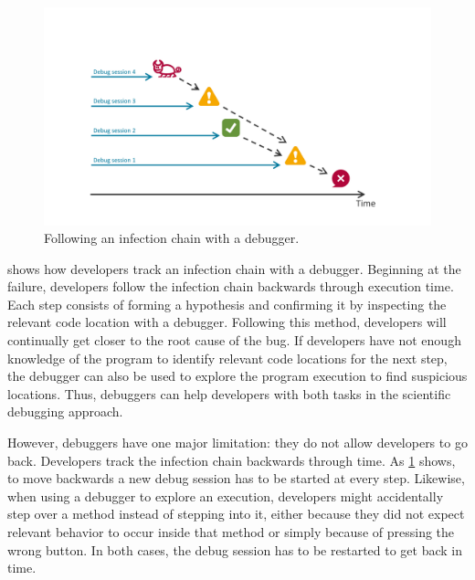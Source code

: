 \begin{figure}[t]
\centering
\includegraphics[width=.9\linewidth]{img/workflow-traditional}
\caption{Following an infection chain with a debugger.}
\label{fig:workflow-traditional}
\end{figure}

 shows how developers track an infection chain with a debugger.
Beginning at the failure, developers follow the infection chain backwards through execution time.
Each step consists of forming a hypothesis and confirming it by inspecting the relevant code location with a debugger. 
Following this method, developers will continually get closer to the root cause of the bug.
If developers have not enough knowledge of the program to identify relevant code locations for the next step, the debugger can also be used to explore the program execution to find suspicious locations.
Thus, debuggers can help developers with both tasks in the scientific debugging approach.

However, debuggers have one major limitation: they do not allow developers to go back.
Developers track the infection chain backwards through time.
As \cref{fig:workflow-traditional} shows, to move backwards a new debug session has to be started at every step.
Likewise, when using a debugger to explore an execution, developers might accidentally step over a method instead of stepping into it, either because they did not expect relevant behavior to occur inside that method or simply because of pressing the wrong button.
In both cases, the debug session has to be restarted to get back in time.

